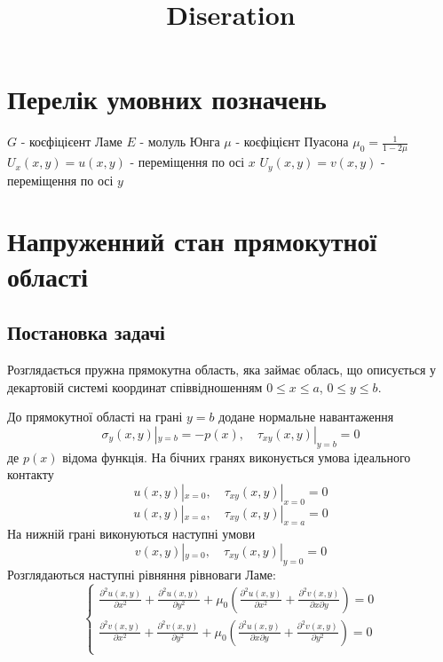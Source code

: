 \documentclass[a4paper,14pt]{extarticle}
\title{Diseration}
\author{}
\date{}
\numberwithin{equation}{section}
\begin{document}
\maketitle

\newpage

\renewcommand{\contentsname}{\centering Зміст}
\tableofcontents

\newpage

\section*{\centering Перелік умовних позначень}
$G$ - коєфіцієент Ламе \newline
$E$ - молуль Юнга \newline
$\mu$ - коєфіцієнт Пуасона \newline
$\mu_0 = \frac{1}{1 - 2\mu}$ \newline
$U_x(x,y) = u(x,y)$ - переміщення по осі $x$ \newline
$U_y(x,y) = v(x,y)$ - переміщення по осі $y$

\section{Напруженний стан прямокутної області}
\subsection{Постановка задачі}
Розглядається пружна прямокутна область, яка займає облась,
що описується у декартовій системі координат співвідношенням $0 \le x \le a$, $0 \le y \le b$.

До прямокутної області на грані $y=b$ додане нормальне навантаження
\begin{equation}
    \sigma_y(x, y) |_{y=b} = -p(x), \quad  \tau_{xy}(x,y) |_{y=b} =0
\end{equation}
де $p(x)$ відома функція.
На бічних гранях виконується умова ідеального контакту
\begin{equation}
    u(x,y) |_{x=0}, \quad \tau_{xy}(x,y) |_{x=0} =0
\end{equation}
\begin{equation}
    u(x,y) |_{x=a}, \quad \tau_{xy}(x,y) |_{x=a} =0
\end{equation}
На нижній грані виконуються наступні умови
\begin{equation}
    v(x,y) |_{y=0}, \quad \tau_{xy}(x,y) |_{y=0} =0
\end{equation}
Розглядаються наступні рівняння рівноваги Ламе:
\begin{equation}\label{lame_1}
    \begin{cases}
        \frac{\partial^2 u(x,y)}{\partial x^2} + \frac{\partial^2 u(x,y)}{\partial y^2} + \mu_0 (\frac{\partial^2 u(x,y)}{\partial x^2} + \frac{\partial^2 v(x,y)}{\partial x\partial y}) = 0 \\
        \frac{\partial^2 v(x,y)}{\partial x^2} + \frac{\partial^2 v(x,y)}{\partial y^2} + \mu_0 (\frac{\partial^2 u(x,y)}{\partial x \partial y} + \frac{\partial^2 v(x,y)}{\partial y^2}) = 0 \\
    \end{cases}
\end{equation}
\end{document}
